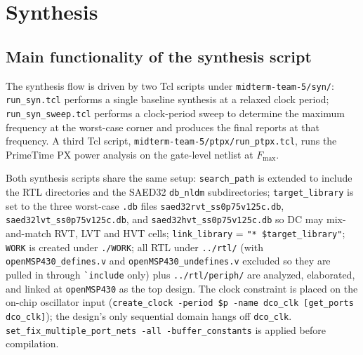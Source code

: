 \section{Synthesis}

\subsection{Main functionality of the synthesis script}

The synthesis flow is driven by two Tcl scripts under
\texttt{midterm-team-5/syn/}: \texttt{run\_syn.tcl} performs a single
baseline synthesis at a relaxed clock period; \texttt{run\_syn\_sweep.tcl}
performs a clock-period sweep to determine the maximum frequency at the
worst-case corner and produces the final reports at that frequency.
A third Tcl script, \texttt{midterm-team-5/ptpx/run\_ptpx.tcl}, runs the
PrimeTime PX power analysis on the gate-level netlist at $F_\mathrm{max}$.

Both synthesis scripts share the same setup: \texttt{search\_path} is
extended to include the RTL directories and the SAED32
\texttt{db\_nldm} subdirectories; \texttt{target\_library} is set to the
three worst-case \texttt{.db} files
\texttt{saed32rvt\_ss0p75v125c.db},
\texttt{saed32lvt\_ss0p75v125c.db}, and
\texttt{saed32hvt\_ss0p75v125c.db} so DC may mix-and-match RVT, LVT and
HVT cells; \texttt{link\_library} = \texttt{"* \$target\_library"};
\texttt{WORK} is created under \texttt{./WORK}; all RTL under
\texttt{../rtl/} (with \texttt{openMSP430\_defines.v} and
\texttt{openMSP430\_undefines.v} excluded so they are pulled in through
\verb|`include| only) plus \texttt{../rtl/periph/} are analyzed,
elaborated, and linked at \texttt{openMSP430} as the top design.
The clock constraint is placed on the on-chip oscillator input
(\texttt{create\_clock -period \$p -name dco\_clk
[get\_ports dco\_clk]}); the design's only sequential domain hangs off
\texttt{dco\_clk}. \texttt{set\_fix\_multiple\_port\_nets -all
-buffer\_constants} is applied before compilation.

